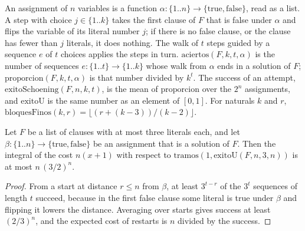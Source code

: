 \begin{definition}
  \label{def:search-schoening}
  \leanok
  An assignment of $n$ variables is a function $\alpha : \{1..n\} \to \{\mathrm{true},
  \mathrm{false}\}$, read as a list. A step with choice $j \in \{1..k\}$ takes the first clause of $F$
  that is false under $\alpha$ and flips the variable of its literal number $j$; if there is no
  false clause, or the clause has fewer than $j$ literals, it does nothing. The walk of $t$ steps
  guided by a sequence $e$ of $t$ choices applies the steps in turn. $\mathrm{aciertos}(F, k, t,
  \alpha)$ is the number of sequences $e : \{1..t\} \to \{1..k\}$ whose walk from $\alpha$ ends in a
  solution of $F$; $\mathrm{proporcion}(F, k, t, \alpha)$ is that number divided by $k^t$. The success
  of an attempt, $\mathrm{exitoSchoening}(F, n, k, t)$, is the mean of $\mathrm{proporcion}$ over the
  $2^n$ assignments, and $\mathrm{exitoU}$ is the same number as an element of $[0, 1]$. For
  naturals $k$ and $r$, $\mathrm{bloquesFinos}(k, r) = \lfloor (r + (k - 3)) / (k - 2) \rfloor$.
  \own{}
\end{definition}

\begin{theorem}
  \label{thm:search-tiempo-facil-tres}
  \leanok
  Let $F$ be a list of clauses with at most three literals each, and let $\beta : \{1..n\} \to
  \{\mathrm{true}, \mathrm{false}\}$ be an assignment that is a solution of $F$. Then the integral of the
  cost $n(x + 1)$ with respect to $\mathrm{tramos}(1, \mathrm{exitoU}(F, n, 3, n))$ is at most
  $n\,(3/2)^n$.
\end{theorem}

\begin{proof}
  \leanok
  From a start at distance $r \le n$ from $\beta$, at least $3^{t-r}$ of the $3^t$ sequences of
  length $t$ succeed, because in the first false clause some literal is true under $\beta$ and
  flipping it lowers the distance. Averaging over starts gives success at least $(2/3)^n$, and the
  expected cost of restarts is $n$ divided by the success.
\end{proof}

